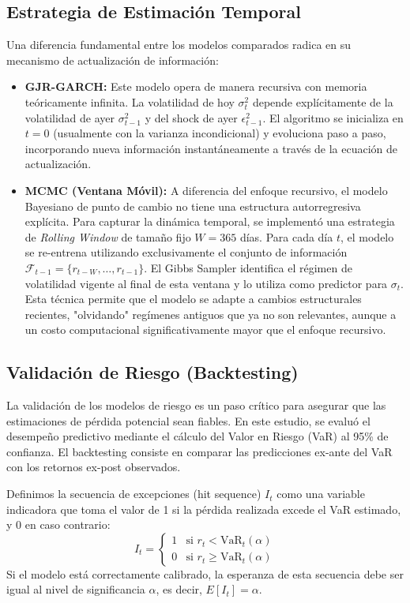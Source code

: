 \documentclass[
]{ceurart}
\begin{document}
\subsection{Estrategia de Estimación Temporal}
Una diferencia fundamental entre los modelos comparados radica en su mecanismo de actualización de información:

\begin{itemize}
    \item \textbf{GJR-GARCH:} Este modelo opera de manera recursiva con memoria teóricamente infinita. La volatilidad de hoy $\sigma_t^2$ depende explícitamente de la volatilidad de ayer $\sigma_{t-1}^2$ y del shock de ayer $\epsilon_{t-1}^2$. El algoritmo se inicializa en $t=0$ (usualmente con la varianza incondicional) y evoluciona paso a paso, incorporando nueva información instantáneamente a través de la ecuación de actualización.

    \item \textbf{MCMC (Ventana Móvil):} A diferencia del enfoque recursivo, el modelo Bayesiano de punto de cambio no tiene una estructura autorregresiva explícita. Para capturar la dinámica temporal, se implementó una estrategia de \textit{Rolling Window} de tamaño fijo $W=365$ días.
    Para cada día $t$, el modelo se re-entrena utilizando exclusivamente el conjunto de información $\mathcal{F}_{t-1} = \{r_{t-W}, \dots, r_{t-1}\}$. El Gibbs Sampler identifica el régimen de volatilidad vigente al final de esta ventana y lo utiliza como predictor para $\sigma_t$. Esta técnica permite que el modelo se adapte a cambios estructurales recientes, "olvidando" regímenes antiguos que ya no son relevantes, aunque a un costo computacional significativamente mayor que el enfoque recursivo.
\end{itemize}

\subsection{Validación de Riesgo (Backtesting)}
La validación de los modelos de riesgo es un paso crítico para asegurar que las estimaciones de pérdida potencial sean fiables. En este estudio, se evaluó el desempeño predictivo mediante el cálculo del Valor en Riesgo (VaR) al 95\% de confianza. El backtesting consiste en comparar las predicciones ex-ante del VaR con los retornos ex-post observados.

Definimos la secuencia de excepciones (hit sequence) $I_t$ como una variable indicadora que toma el valor de 1 si la pérdida realizada excede el VaR estimado, y 0 en caso contrario:
\begin{equation}
I_t = \begin{cases}
1 & \text{si } r_t < \text{VaR}_t(\alpha) \\
0 & \text{si } r_t \ge \text{VaR}_t(\alpha)
\end{cases}
\end{equation}
Si el modelo está correctamente calibrado, la esperanza de esta secuencia debe ser igual al nivel de significancia $\alpha$, es decir, $E[I_t] = \alpha$.
\end{document}
